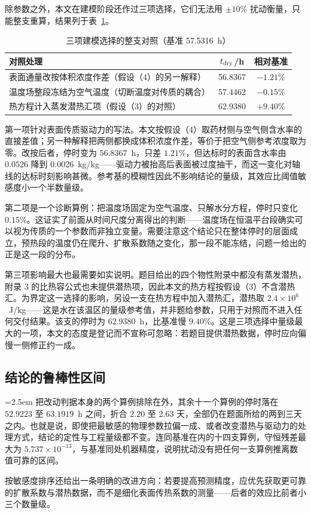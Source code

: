 除参数之外，本文在建模阶段还作过三项选择，它们无法用 $\pm10\%$ 扰动衡量，只能整支重算，结果列于表~\ref{tab:sens-model}。

\begin{table}[H]
\centering
\caption{三项建模选择的整支对照（基准 57.5316~h）}\label{tab:sens-model}
\begin{tabular}{lcc}
\toprule
对照处理 & $t_{\rm dry}$/h & 相对基准 \\
\midrule
表面通量改按体积浓度作差（假设（4）的另一解释） & 56.8367 & $-1.21\%$ \\
温度场整段冻结为空气温度（切断温度对传质的耦合） & 57.4462 & $-0.15\%$ \\
热方程计入蒸发潜热汇项（假设（3）的对照） & 62.9380 & $+9.40\%$ \\
\bottomrule
\end{tabular}
\end{table}

第一项针对表面传质驱动力的写法。本文按假设（4）取药材侧与空气侧含水率的直接差值；另一种解释把两侧都换成体积浓度作差，等价于把空气侧参考浓度取为零。改按后者，停时变为 $56.8367$~h，只差 $1.21\%$，但达标时的表面含水率由 $0.0526$ 降到 $0.0026$~kg/kg——驱动力被抬高后表面被过度抽干，而这一变化对轴线的达标时刻影响甚微。参考基的模糊性因此不影响结论的量级，其效应比阈值敏感度小一个半数量级。

第二项是一个诊断算例：把温度场固定为空气温度、只解水分方程，停时只变化 $0.15\%$。这证实了前面从时间尺度分离得出的判断——温度场在恒温平台段确实可以视为传质的一个参数而非独立变量。需要注意这个结论只在整体停时的层面成立，预热段的温度仍在爬升、扩散系数随之变化，那一段不能冻结，问题一给出的正是这一段的分布。

第三项影响最大也最需要如实说明。题目给出的四个物性附录中都没有蒸发潜热，附录 3 的比热容公式也未提供潜热项，因此本文的热方程按假设（3）不含潜热汇。为界定这一选择的影响，另设一支在热方程中加入潜热汇，潜热取 $2.4\times10^6$~J/kg——这是水在该温区的量级参考值，并非题给参数，只用于对照而不进入任何交付结果。该支的停时为 $62.9380$~h，比基准慢 $9.40\%$。这是三项选择中量级最大的一项，本文的态度是登记而不宣称可忽略：若题目提供潜热数据，停时应向偏慢一侧修正约一成。

\subsection{结论的鲁棒性区间}

{\emergencystretch=2.5em
把改动判据本身的两个算例排除在外，其余十一个算例的停时落在 $52.9223$ 至 $63.1919$~h 之间，折合 $2.20$ 至 $2.63$ 天，全部仍在题面所给的两到三天之内。也就是说，即使把最敏感的物理参数拉偏一成、或者改变潜热与驱动力的处理方式，结论的定性与工程量级都不变。连同基准在内的十四支算例，守恒残差最大为 $5.737\times10^{-13}$，与基准同处机器精度，说明扰动没有把任何一支算例推离数值可靠的区间。\par}

按敏感度排序还给出一条明确的改进方向：若要提高预测精度，应优先获取更可靠的扩散系数与潜热数据，而不是细化表面传热系数的测量——后者的效应比前者小三个数量级。
